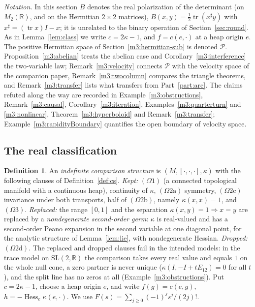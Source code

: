 \documentclass[11pt,reqno]{amsart}
\theoremstyle{definition}
\newtheorem{definition}[theorem]{Definition}
\theoremstyle{remark}
\numberwithin{equation}{section}
\newcommand{\R}{\mathbb{R}}
\newcommand{\hp}[3]{[#1,#2,#3]}
\begin{document}
\emph{Notation.}  In this section $B$ denotes the real polarization of the determinant (on $M_2(\R)$, and on the Hermitian
$2\times2$ matrices), $B(x,y)=\tfrac12\operatorname{tr}(x^\sharp y)$ with $x^\sharp=(\operatorname{tr}x)I-x$; it is unrelated to the
binary operation of Section~\ref{sec:round}.  As in Lemma~\ref{lem:class} we write $c=2\kappa-1$, and $f=c(e,\cdot)$ at a heap
origin $e$.  The positive Hermitian space of Section~\ref{m3:hermitian-sub} is denoted $\mathcal P$.  Proposition~\ref{m3:abelian}
treats the abelian case and Corollary~\ref{m3:interference} the two-variable law; Remark~\ref{m3:velocity} connects $\mathcal P$ with the
velocity space of the companion paper, Remark~\ref{m3:twocolumn} compares the triangle theorems, and Remark~\ref{m3:transfer} lists
what transfers from Part~\ref{part:arc}.  The claims refuted along the way are recorded in Example~\ref{m3:obstructions},
Remark~\ref{m3:causal}, Corollary~\ref{m3:iteration}, Examples~\ref{m3:quarterturn} and \ref{m3:nonlinear}, Theorem~\ref{m3:hyperboloid}
and Remark~\ref{m3:transfer}; Example~\ref{m3:rapidityBoundary} quantifies the open boundary of velocity space.

\subsection{The real classification}

\begin{definition}\label{m3:axiom}
An \emph{indefinite comparison structure} is $(M,\hp\cdot\cdot\cdot,\kappa)$ with the following clauses of Definition~\ref{def:cs}.
\emph{Kept:} $(\Omega1)$ (a connected topological manifold with a continuous heap), continuity of $\kappa$, $(\Omega2\mathrm a)$
symmetry, $(\Omega2\mathrm c)$ invariance under both transports, half of $(\Omega2\mathrm b)$, namely $\kappa(x,x)=1$, and $(\Omega3)$.
\emph{Replaced:} the range $[0,1]$ and the separation $\kappa(x,y)=1\Rightarrow x=y$ are replaced by a \emph{nondegenerate second-order
germ}: $\kappa$ is real-valued and has a second-order Peano expansion in the second variable at one diagonal point, for the analytic
structure of Lemma~\ref{lem:lie}, with nondegenerate Hessian.  \emph{Dropped:} $(\Omega2\mathrm d)$.  The replaced and dropped clauses
fail in the intended models: in the trace model on $\mathrm{SL}(2,\R)$ the comparison takes every real value and equals $1$ on the
whole null cone, a zero partner is never unique ($\kappa(I,-I+tE_{12})=0$ for all $t$), and the split line has no zeros at all
(Example~\ref{m3:obstructions}).  Put
\(c=2\kappa-1\), choose a heap origin \(e\), and write
\(f(g)=c(e,g)\), \(h=-\operatorname{Hess}_e\kappa(e,\cdot)\).
We use \(F(s)=\sum_{j\ge0}(-1)^j s^j/(2j)!\).
\end{definition}
\end{document}
